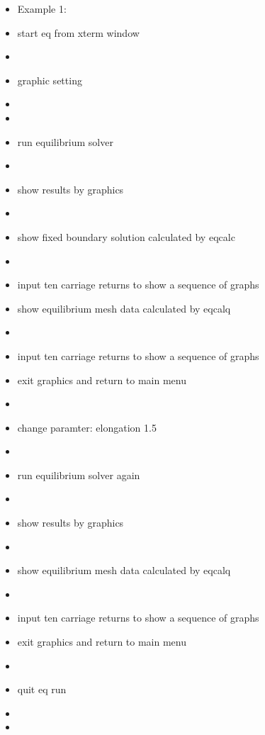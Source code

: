 \documentclass[11pt]{article}
\begin{document}
\begin{itemize}
\item[] Example 1:
\item[\quad] start eq from xterm window
\item[\quad] 
\item[\quad] graphic setting
\item[\quad] 
\item[\quad] 
\item[\quad] run equilibrium solver
\item[\quad] 
\item[\quad] show results by graphics
\item[\quad] 
\item[\quad] show fixed boundary solution calculated by eqcalc
\item[\quad] 
\item[\quad] input ten carriage returns to show a sequence of graphs
\item[\quad] show equilibrium mesh data calculated by eqcalq
\item[\quad] 
\item[\quad] input ten carriage returns to show a sequence of graphs
\item[\quad] exit graphics and return to main menu
\item[\quad] 
\item[\quad] change paramter: elongation 1.5
\item[\quad] 
\item[\quad] run equilibrium solver again
\item[\quad] 
\item[\quad] show results by graphics
\item[\quad] 
\item[\quad] show equilibrium mesh data calculated by eqcalq
\item[\quad] 
\item[\quad] input ten carriage returns to show a sequence of graphs
\item[\quad] exit graphics and return to main menu
\item[\quad] 
\item[\quad] quit eq run
\item[\quad] 
\item[\quad]
  

\end{itemize}
\end{document}
